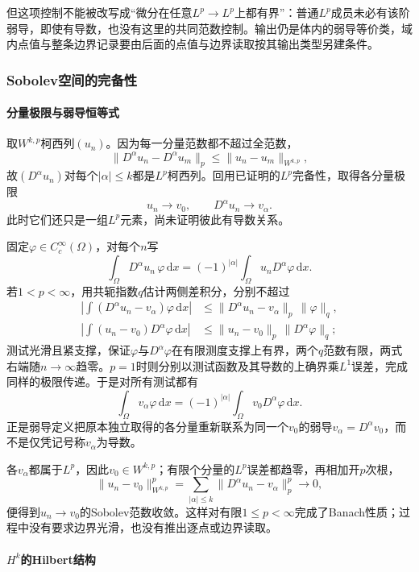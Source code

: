 但这项控制不能被改写成“微分在任意$L^p\to L^p$上都有界”：普通$L^p$成员未必有该阶弱导，即使有导数，也没有这里的共同范数控制。输出仍是体内的弱导等价类，域内点值与整条边界记录要由后面的点值与边界读取按其输出类型另建条件。

\subsubsection{Sobolev空间的完备性}
\label{subsubsec:sobolev-completeness}

\paragraph{分量极限与弱导恒等式}

取$W^{k,p}$柯西列$(u_n)$。因为每一分量范数都不超过全范数，
\[
  \|D^\alpha u_n-D^\alpha u_m\|_p\le\|u_n-u_m\|_{W^{k,p}},
\]
故$(D^\alpha u_n)$对每个$|\alpha|\le k$都是$L^p$柯西列。回用已证明的$L^p$完备性，取得各分量极限
\[
  u_n\to v_0,\qquad D^\alpha u_n\to v_\alpha.
\]
此时它们还只是一组$L^p$元素，尚未证明彼此有导数关系。

固定$\varphi\in C_c^\infty(\Omega)$，对每个$n$写
\[
  \int_\Omega D^\alpha u_n\,\varphi\,\mathrm dx
  =(-1)^{|\alpha|}\int_\Omega u_nD^\alpha\varphi\,\mathrm dx.
\]
若$1<p<\infty$，用共轭指数$q$估计两侧差积分，分别不超过
\[
\begin{aligned}
  \left|\int(D^\alpha u_n-v_\alpha)\varphi\,\mathrm dx\right|
  &\le\|D^\alpha u_n-v_\alpha\|_p\,\|\varphi\|_q,\\
  \left|\int(u_n-v_0)D^\alpha\varphi\,\mathrm dx\right|
  &\le\|u_n-v_0\|_p\,\|D^\alpha\varphi\|_q;
\end{aligned}
\]
测试光滑且紧支撑，保证$\varphi$与$D^\alpha\varphi$在有限测度支撑上有界，两个$q$范数有限，两式右端随$n\to\infty$趋零。$p=1$时则分别以测试函数及其导数的上确界乘$L^1$误差，完成同样的极限传递。于是对所有测试都有
\[
  \int_\Omega v_\alpha\varphi\,\mathrm dx
  =(-1)^{|\alpha|}\int_\Omega v_0D^\alpha\varphi\,\mathrm dx.
\]
正是弱导定义把原本独立取得的各分量重新联系为同一个$v_0$的弱导$v_\alpha=D^\alpha v_0$，而不是仅凭记号称$v_\alpha$为导数。

各$v_\alpha$都属于$L^p$，因此$v_0\in W^{k,p}$；有限个分量的$L^p$误差都趋零，再相加开$p$次根，
\[
  \|u_n-v_0\|_{W^{k,p}}^p
  =\sum_{|\alpha|\le k}\|D^\alpha u_n-v_\alpha\|_p^p\longrightarrow0,
\]
便得到$u_n\to v_0$的Sobolev范数收敛。这样对有限$1\le p<\infty$完成了Banach性质；过程中没有要求边界光滑，也没有推出逐点或边界读取。

\paragraph{$H^k$的Hilbert结构}

